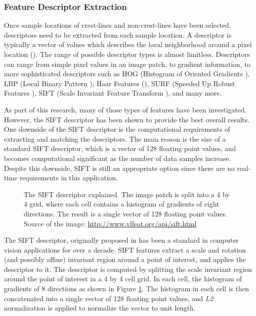 \subsubsection{Feature Descriptor Extraction} \label{subsubsec:feature_descriptor_extraction}

Once sample locations of crest-lines and non-crest-lines have been selected, descriptors need to be extracted from each sample location. A descriptor is typically a vector of values which describes the local neighborhood around a pixel location (\cite{lowe_sift_paper,1994_good_features_to_track,1998_feature_detection,2007_invariant_features_survey}). The range of possible descriptor types is almost limitless. Descriptors can range from simple pixel values in an image patch, to gradient information, to more sophisticated descriptors such as HOG (Histogram of Oriented Gradients \cite{2007_hog_human_detection}), LBP (Local Binary Pattern \cite{1994_lbp_paper,1996_lbp_paper}), Haar Features (\cite{2001_viola_jones_paper}), SURF (Speeded Up Robust Features \cite{2006_surf}), SIFT (Scale Invariant Feature Transform \cite{lowe_sift_paper}), and many more.

As part of this research, many of those types of features have been investigated. However, the SIFT descriptor has been shown to provide the best overall results. One downside of the SIFT descriptor is the computational requirements of extracting and matching the descriptors. The main reason is the size of a standard SIFT descriptor, which is a vector of 128 floating point values, and becomes computational significant as the number of data samples increase. Despite this downside, SIFT is still an appropriate option since there are no real-time requirements in this application.

\begin{figure}
	\centering
	\caption{The SIFT descriptor explained. The image patch is split into a 4 by 4 grid, where each cell contains a histogram of gradients of eight directions. The result is a single vector of 128 floating point values. Source of the image: \underline{http://www.vlfeat.org/api/sift.html}}
	\label{fig:sift_descriptor}
\end{figure}

The SIFT descriptor, originally proposed in \cite{lowe_sift_paper} has been a standard in computer vision applications for over a decade. SIFT features extract a scale and rotation (and possibly affine) invariant region around a point of interest, and applies the descriptor to it. The descriptor is computed by splitting the scale invariant region around the point of interest in a 4 by 4 cell grid. In each cell, the histogram of gradients of 8 directions as shown in Figure \ref{fig:sift_descriptor}. The histogram in each cell is then concatenated into a single vector of 128 floating point values, and \emph{L2} normalization is applied to normalize the vector to unit length.   

